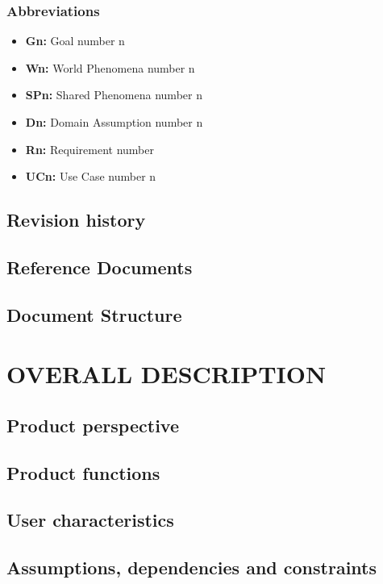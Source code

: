 \documentclass{article}
\begin{document}
\subsubsection{Abbreviations}

\begin{itemize}
    \item \textbf{Gn:} Goal number n
    \item \textbf{Wn:} World Phenomena number n
    \item \textbf{SPn:} Shared Phenomena number n
    \item \textbf{Dn:} Domain Assumption number n
    \item \textbf{Rn:} Requirement number 
    \item \textbf{UCn:} Use Case number n
\end{itemize}


\subsection{Revision history}
\subsection{Reference Documents}
\subsection{Document Structure}

\section{OVERALL DESCRIPTION}
\subsection{Product perspective}
\subsection{Product functions}
\subsection{User characteristics}
\subsection{Assumptions, dependencies and constraints}
\end{document}
